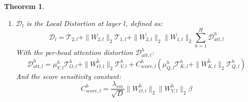 \documentclass[a4paper,14pt]{extarticle}
\newtheorem{theorem}{Theorem}
\begin{document}
\begin{theorem}
\begin{enumerate}
            \item $\mathcal{D}_l$ is the Local Distortion at layer $l$, defined as:
                    $$ \mathcal{D}_l = \mathcal{T}_{2,l} + \|\overline{W_{2,l}}\|_2 \mathcal{T}_{1,l} + \|\overline{W_{2,l}}\|_2 \|\overline{W_{1,l}}\|_2 \sum_{h=1}^H \mathcal{D}_{att, l}^h $$
                With the per-head attention distortion $\mathcal{D}_{att, l}^h$:
                $$ \mathcal{D}_{att, l}^h = \mu_{V,l}^h \mathcal{T}_{O,l}^h + \|\overline{W_{O,l}^h}\|_2 \mathcal{T}_{V,l}^h + C_{score,l}^h (\mu_{Q,l}^h \mathcal{T}_{K,l}^h + \|\overline{W_{K,l}^h}\|_2 \mathcal{T}_{Q,l}^h) $$
                And the score sensitivity constant:
                    $$ C_{score,l}^h = \frac{\lambda_{sm}}{\sqrt{D}} \|\overline{W_{O,l}^h}\|_2 \|\overline{W_{V,l}^h}\|_2 \beta $$
        \end{enumerate}               

    \end{theorem}
\end{document}

